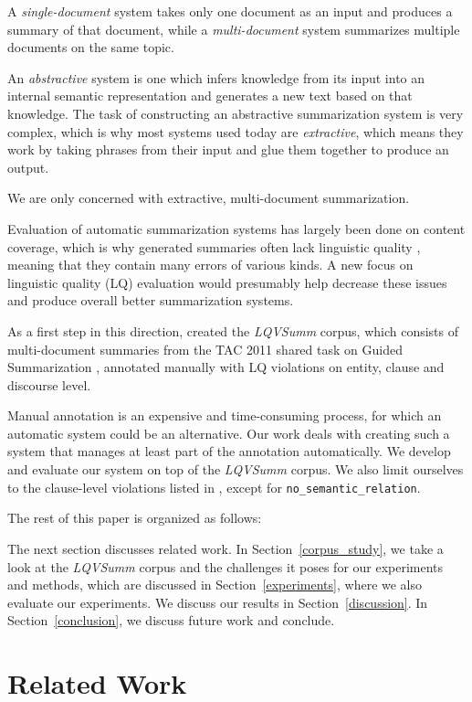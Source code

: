 \documentclass[a4paper,10pt]{scrartcl}
\theoremstyle{style}
\begin{document}
A \textit{single-document} system takes only one document as an input and produces a summary of that document, while a \textit{multi-document} system summarizes multiple documents on the same topic.

An \textit{abstractive} system is one which infers knowledge from its input into an internal semantic representation and generates a new text based on that knowledge. The task of constructing an abstractive summarization system is very complex, which is why most systems used today are \textit{extractive}, which means they work by taking phrases from their input and glue them together to produce an output.

We are only concerned with extractive, multi-document summarization.

Evaluation of automatic summarization systems has largely been done on content coverage, which is why generated summaries often lack linguistic quality \citep{nenkova2011foundations}, meaning that they contain many errors of various kinds. A new focus on linguistic quality (LQ) evaluation would presumably help decrease these issues and produce overall better summarization systems.

As a first step in this direction, \cite{friedrichlqvsumm} created the \textit{LQVSumm} corpus, which consists of multi-document summaries from the TAC 2011 shared task on Guided Summarization \citep{owczarzak2011overview}, annotated manually with LQ violations on entity, clause and discourse level.

Manual annotation is an expensive and time-consuming process, for which an automatic system could be an alternative. Our work deals with creating such a system that manages at least part of the annotation automatically. We develop and evaluate our system on top of the \textit{LQVSumm} corpus. We also limit ourselves to the clause-level violations listed in \cite{friedrichlqvsumm}, except for \texttt{no\_semantic\_relation}.

The rest of this paper is organized as follows:

The next section discusses related work. In Section~\ref{corpus_study}, we take a look at the \textit{LQVSumm} corpus and the challenges it poses for our experiments and methods, which are discussed in Section~\ref{experiments}, where we also evaluate our experiments. We discuss our results in Section~\ref{discussion}. In Section~\ref{conclusion}, we discuss future work and conclude.

\section{Related Work}
\label{related_work}
\end{document}
